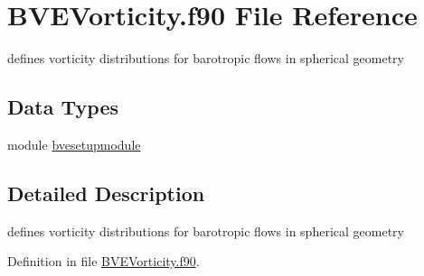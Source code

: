 \hypertarget{BVEVorticity_8f90}{\section{B\+V\+E\+Vorticity.\+f90 File Reference}
\label{BVEVorticity_8f90}
}


defines vorticity distributions for barotropic flows in spherical geometry  


\subsection*{Data Types}
\begin{DoxyCompactItemize}
\item 
module \hyperlink{classbvesetupmodule}{bvesetupmodule}
\end{DoxyCompactItemize}


\subsection{Detailed Description}
defines vorticity distributions for barotropic flows in spherical geometry 



Definition in file \hyperlink{BVEVorticity_8f90_source}{B\+V\+E\+Vorticity.\+f90}.

